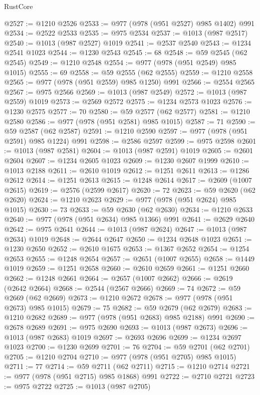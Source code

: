 \begin{lexlean}{RustCore}
\begin{coremodule}
@2527 := @1210 @2526
@2533 := @977 (@978 (@951 @2527) @985 @1402) @991
@2534 := @2522 @2533
@2535 := @975 @2534
@2537 := @1013 (@987 @2517)
@2540 := @1013 (@987 @2527) @1019
@2541 := @2537 @2540
@2543 := @1234 @2541 @1023
@2544 := @1230 @2543
@2545 := 68
@2548 := @59 @2545 (@62 @2545)
@2549 := @1210 @2548
@2554 := @977 (@978 (@951 @2549) @985 @1015)
@2555 := 69
@2558 := @59 @2555 (@62 @2555)
@2559 := @1210 @2558
@2565 := @977 (@978 (@951 @2559) @985 @1250) @991
@2566 := @2554 @2565
@2567 := @975 @2566
@2569 := @1013 (@987 @2549)
@2572 := @1013 (@987 @2559) @1019
@2573 := @2569 @2572
@2575 := @1234 @2573 @1023
@2576 := @1230 @2575
@2577 := 70
@2580 := @59 @2577 (@62 @2577)
@2581 := @1210 @2580
@2586 := @977 (@978 (@951 @2581) @985 @1015)
@2587 := 71
@2590 := @59 @2587 (@62 @2587)
@2591 := @1210 @2590
@2597 := @977 (@978 (@951 @2591) @985 @1224) @991
@2598 := @2586 @2597
@2599 := @975 @2598
@2601 := @1013 (@987 @2581)
@2604 := @1013 (@987 @2591) @1019
@2605 := @2601 @2604
@2607 := @1234 @2605 @1023
@2609 := @1230 @2607 @1999
@2610 := @1013 @2188
@2611 := @2610 @1019
@2612 := @1251 @2611
@2613 := @1286 @2612
@2614 := @1251 @2613
@2615 := @1248 @2614
@2617 := @2609 (@1007 @2615)
@2619 := @2576 (@2599 @2617)
@2620 := 72
@2623 := @59 @2620 (@62 @2620)
@2624 := @1210 @2623
@2629 := @977 (@978 (@951 @2624) @985 @1015)
@2630 := 73
@2633 := @59 @2630 (@62 @2630)
@2634 := @1210 @2633
@2640 := @977 (@978 (@951 @2634) @985 @1366) @991
@2641 := @2629 @2640
@2642 := @975 @2641
@2644 := @1013 (@987 @2624)
@2647 := @1013 (@987 @2634) @1019
@2648 := @2644 @2647
@2650 := @1234 @2648 @1023
@2651 := @1230 @2650
@2652 := @2610 @1675
@2653 := @1367 @2652
@2654 := @1254 @2653
@2655 := @1248 @2654
@2657 := @2651 (@1007 @2655)
@2658 := @1449 @1019
@2659 := @1251 @2658
@2660 := @2610 @2659
@2661 := @1251 @2660
@2662 := @1248 @2661
@2664 := @2657 (@1007 @2662)
@2666 := @2619 (@2642 @2664)
@2668 := @2544 (@2567 @2666)
@2669 := 74
@2672 := @59 @2669 (@62 @2669)
@2673 := @1210 @2672
@2678 := @977 (@978 (@951 @2673) @985 @1015)
@2679 := 75
@2682 := @59 @2679 (@62 @2679)
@2683 := @1210 @2682
@2689 := @977 (@978 (@951 @2683) @985 @2188) @991
@2690 := @2678 @2689
@2691 := @975 @2690
@2693 := @1013 (@987 @2673)
@2696 := @1013 (@987 @2683) @1019
@2697 := @2693 @2696
@2699 := @1234 @2697 @1023
@2700 := @1230 @2699
@2701 := 76
@2704 := @59 @2701 (@62 @2701)
@2705 := @1210 @2704
@2710 := @977 (@978 (@951 @2705) @985 @1015)
@2711 := 77
@2714 := @59 @2711 (@62 @2711)
@2715 := @1210 @2714
@2721 := @977 (@978 (@951 @2715) @985 @1868) @991
@2722 := @2710 @2721
@2723 := @975 @2722
@2725 := @1013 (@987 @2705)

\end{coremodule}
\end{lexlean}
